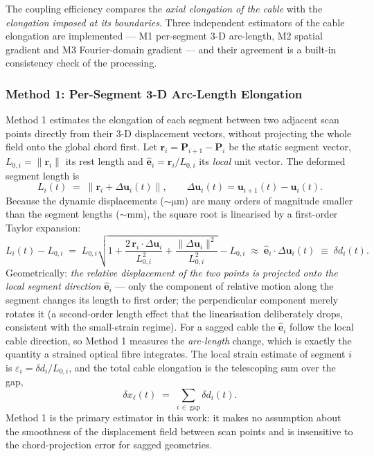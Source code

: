 The coupling efficiency compares the \emph{axial elongation of the cable}
with the \emph{elongation imposed at its boundaries}. Three independent
estimators of the cable elongation are implemented --- M1 per-segment 3-D
arc-length, M2 spatial gradient and M3 Fourier-domain gradient --- and their
agreement is a built-in consistency check of the processing.

\subsubsection{Method 1: Per-Segment 3-D Arc-Length Elongation}
\label{sec:proc:strain:m1}
Method 1 estimates the elongation of each segment between two adjacent scan
points directly from their 3-D displacement vectors, without projecting the
whole field onto the global chord first. Let
$\mathbf{r}_i = \mathbf{P}_{i+1} - \mathbf{P}_i$ be the static segment
vector, $L_{0,i} = \lVert\mathbf{r}_i\rVert$ its rest length and
$\hat{\mathbf{e}}_i = \mathbf{r}_i / L_{0,i}$ its \emph{local} unit vector.
The deformed segment length is
\begin{equation}
  L_i(t) \;=\; \bigl\lVert \mathbf{r}_i
      + \Delta\mathbf{u}_i(t) \bigr\rVert ,
  \qquad
  \Delta\mathbf{u}_i(t) = \mathbf{u}_{i+1}(t) - \mathbf{u}_i(t).
\end{equation}
Because the dynamic displacements ($\sim\si{\micro\meter}$) are many orders
of magnitude smaller than the segment lengths ($\sim\si{\milli\meter}$), the
square root is linearised by a first-order Taylor expansion:
\begin{equation}
  L_i(t) - L_{0,i}
  \;=\; L_{0,i}\sqrt{1
        + \frac{2\,\mathbf{r}_i\!\cdot\!\Delta\mathbf{u}_i}{L_{0,i}^2}
        + \frac{\lVert\Delta\mathbf{u}_i\rVert^2}{L_{0,i}^2}} - L_{0,i}
  \;\approx\;
  \hat{\mathbf{e}}_i \cdot \Delta\mathbf{u}_i(t)
  \;\equiv\; \delta d_i(t).
  \label{eq:strainM1}
\end{equation}
Geometrically: \emph{the relative displacement of the two points is projected
onto the local segment direction} $\hat{\mathbf{e}}_i$ — only the component
of relative motion along the segment changes its length to first order; the
perpendicular component merely rotates it (a second-order length effect that
the linearisation deliberately drops, consistent with the small-strain
regime). For a sagged cable the $\hat{\mathbf{e}}_i$ follow the local cable
direction, so Method 1 measures the \emph{arc-length} change, which is
exactly the quantity a strained optical fibre integrates. The local strain
estimate of segment $i$ is $\varepsilon_i = \delta d_i / L_{0,i}$, and the
total cable elongation is the telescoping sum over the gap,
\begin{equation}
  \delta x_\ell(t) \;=\; \sum_{i\,\in\,\mathrm{gap}} \delta d_i(t).
  \label{eq:deltaxl}
\end{equation}
Method 1 is the primary estimator in this work: it makes no assumption
about the smoothness of the displacement field between scan points and is
insensitive to the chord-projection error for sagged geometries.

